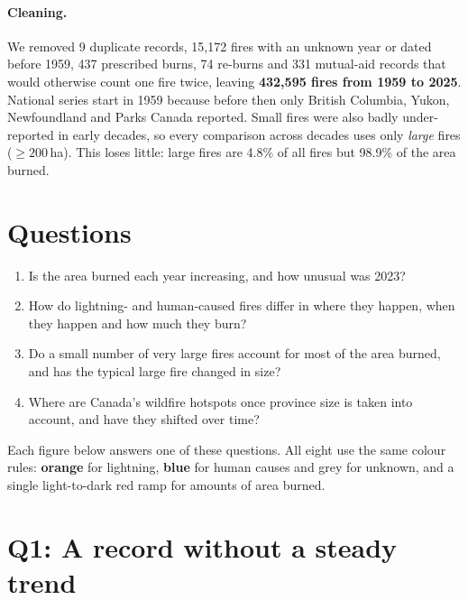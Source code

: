\documentclass[12pt]{article}
\begin{document}
\paragraph{Cleaning.} We removed 9 duplicate records, 15,172 fires with an unknown year or
dated before 1959, 437 prescribed burns, 74 re-burns and 331 mutual-aid records that would
otherwise count one fire twice, leaving \textbf{432,595 fires from 1959 to 2025}. National
series start in 1959 because before then only British Columbia, Yukon, Newfoundland and
Parks Canada reported. Small fires were also badly under-reported in early decades, so
every comparison across decades uses only \emph{large} fires ($\geq 200$\,ha). This loses
little: large fires are 4.8\% of all fires but 98.9\% of the area burned.

\section{Questions}

\begin{enumerate}[itemsep=1pt, topsep=2pt]
  \item[\textbf{Q1}] Is the area burned each year increasing, and how unusual was 2023?
  \item[\textbf{Q2}] How do lightning- and human-caused fires differ in where they happen,
        when they happen and how much they burn?
  \item[\textbf{Q3}] Do a small number of very large fires account for most of the area
        burned, and has the typical large fire changed in size?
  \item[\textbf{Q4}] Where are Canada's wildfire hotspots once province size is taken into
        account, and have they shifted over time?
\end{enumerate}

Each figure below answers one of these questions. All eight use the same colour rules:
\textcolor[HTML]{EB6834}{\textbf{orange}} for lightning,
\textcolor[HTML]{2A78D6}{\textbf{blue}} for human causes and grey for unknown, and a single
light-to-dark red ramp for amounts of area burned.

\section{Q1: A record without a steady trend}
\end{document}
